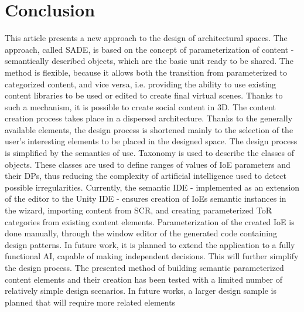 \documentclass[runningheads]{llncs}
\begin{document}
\section{Conclusion}
This article presents a new approach to the design of architectural spaces. The approach, called SADE, is based on the concept of parameterization of content - semantically described objects, which are the basic unit ready to be shared. The method is flexible, because it allows both the transition from parameterized to categorized content, and vice versa, i.e. providing the ability to use existing content libraries to be used or edited to create final virtual scenes. Thanks to such a mechanism, it is possible to create social content in 3D. The content creation process takes place in a dispersed architecture. Thanks to the generally available elements, the design process is shortened mainly to the selection of the user's interesting elements to be placed in the designed space. The design process is simplified by the semantics of use. Taxonomy is used to describe the classes of objects. These classes are used to define ranges of values of IoE parameters and their DPs, thus reducing the complexity of artificial intelligence used to detect possible irregularities. Currently, the semantic IDE - implemented as an extension of the editor to the Unity IDE - ensures creation of IoEs semantic instances in the wizard, importing content from SCR, and creating parameterized ToR categories from existing content elements. Parameterization of the created IoE is done manually, through the window editor of the generated code containing design patterns. In future work, it is planned to extend the application to a fully functional AI, capable of making independent decisions. This will further simplify the design process. The presented method of building semantic parameterized content elements and their creation has been tested with a limited number of relatively simple design scenarios. In future works, a larger design sample is planned that will require more related elements
\end{document}
